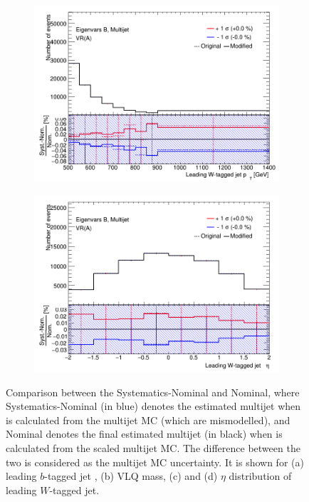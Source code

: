 \begin{figure}[hbt!]
\begin{subfigure}{.35\textwidth}
		\centering
		\includegraphics[width=\linewidth,height=\textheight,keepaspectratio]{VR_B_ljet_pt_Multijets.png}
		\caption{}
		\label{fig:uncertainties:systematics:multijet:ljetpt}
	\end{subfigure}\hspace{0.6cm}
	\begin{subfigure}{.35\textwidth}
		\centering
		\includegraphics[width=\linewidth,height=\textheight,keepaspectratio]{VR_B_ljet_eta_Multijets.png}
		\caption{}
		\label{fig:uncertainties:systematics:multijet:ljeteta}
	\end{subfigure}
	\caption{Comparison between the Systematics-Nominal and Nominal, where Systematics-Nominal (in blue) denotes the estimated multijet when \R is calculated from the multijet MC (which are mismodelled), and Nominal denotes the final estimated multijet (in black) when \R is calculated from the scaled multijet MC. The difference between the two is considered as the multijet MC uncertainty. It is shown for (a) leading $b$-tagged jet \pt, (b) VLQ mass, (c) \pt and (d) $\eta$ distribution of leading $W$-tagged jet.}
	\label{fig:uncertainties:systematics:multijet}
\end{figure}


